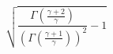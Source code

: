 

\[
\sqrt{\frac{\Gamma(\frac{\gamma + 2} {\gamma})} {(\Gamma(\frac{\gamma + 1} {\gamma}))^{2}} - 1}
\]



